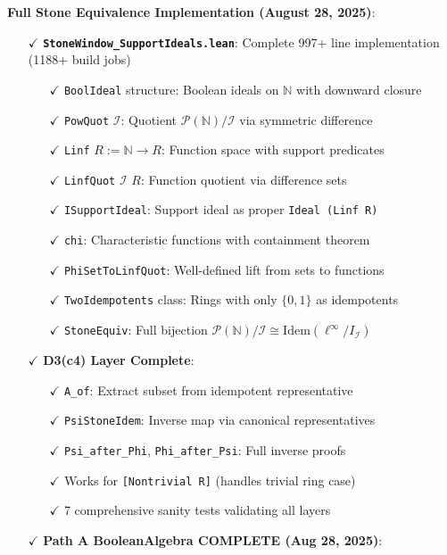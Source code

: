 \documentclass[11pt]{article}
\theoremstyle{definition}
\theoremstyle{remark}
\begin{document}
\textbf{Full Stone Equivalence Implementation (August 28, 2025)}:
\begin{itemize}
\item[$\checkmark$] \textbf{\texttt{StoneWindow\_SupportIdeals.lean}}: Complete 997+ line implementation (1188+ build jobs)
  \begin{itemize}
  \item[$\checkmark$] \texttt{BoolIdeal} structure: Boolean ideals on $\mathbb{N}$ with downward closure
  \item[$\checkmark$] \texttt{PowQuot} $\mathcal{I}$: Quotient $\mathcal{P}(\mathbb{N})/\mathcal{I}$ via symmetric difference
  \item[$\checkmark$] \texttt{Linf} $R := \mathbb{N} \to R$: Function space with support predicates
  \item[$\checkmark$] \texttt{LinfQuot} $\mathcal{I}$ $R$: Function quotient via difference sets
  \item[$\checkmark$] \texttt{ISupportIdeal}: Support ideal as proper \texttt{Ideal (Linf R)}
  \item[$\checkmark$] \texttt{chi}: Characteristic functions with containment theorem
  \item[$\checkmark$] \texttt{PhiSetToLinfQuot}: Well-defined lift from sets to functions
  \item[$\checkmark$] \texttt{TwoIdempotents} class: Rings with only $\{0,1\}$ as idempotents
  \item[$\checkmark$] \texttt{StoneEquiv}: Full bijection $\mathcal{P}(\mathbb{N})/\mathcal{I} \cong \text{Idem}(\ell^\infty/I_{\mathcal{I}})$
  \end{itemize}
\item[$\checkmark$] \textbf{D3(c4) Layer Complete}:
  \begin{itemize}
  \item[$\checkmark$] \texttt{A\_of}: Extract subset from idempotent representative
  \item[$\checkmark$] \texttt{PsiStoneIdem}: Inverse map via canonical representatives
  \item[$\checkmark$] \texttt{Psi\_after\_Phi}, \texttt{Phi\_after\_Psi}: Full inverse proofs
  \item[$\checkmark$] Works for \texttt{[Nontrivial R]} (handles trivial ring case)
  \item[$\checkmark$] 7 comprehensive sanity tests validating all layers
  \end{itemize}
\item[$\checkmark$] \textbf{Path A BooleanAlgebra COMPLETE (Aug 28, 2025)}:

\end{itemize}
\end{document}
